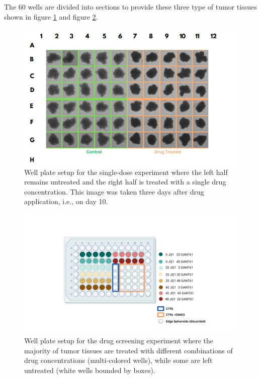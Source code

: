 The 60 wells are divided into sections to provide these three type of tumor tissues shown in figure \ref{fig:Single dose wellplate} and figure \ref{fig:Drug screen wellplate}.
\begin{figure}[H]
  \centering
  \includegraphics[width=0.9\linewidth]{figures/singledose.png} %
  \caption{Well plate setup for the single-dose experiment where the left half remains untreated and the right half is treated with a single drug concentration. This image was taken three days after drug application, i.e., on day 10.}
  \label{fig:Single dose wellplate}
\end{figure}

\begin{figure}[H]
  \centering
  \includegraphics[width=1.2\linewidth]{figures/drug_screened.png} %
  \caption{Well plate setup for the drug screening experiment where the majority of tumor tissues are treated with different combinations of drug concentrations (multi-colored wells), while some are left untreated (white wells bounded by boxes).}
  \label{fig:Drug screen wellplate}
\end{figure}

